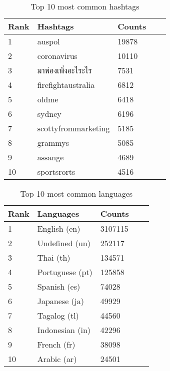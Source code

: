 \documentclass[11pt]{article}
\begin{document}
\begin{table}[h]
 \begin{center}
\begin{tabular}{|l|l|l|l|l|}

      \hline
      Rank &Hashtags & Counts   \\
      \hline\hline
      1 & auspol & 19878 \\
      2 & coronavirus & 10110 \\
      3 & มาพ่องเพิ่งอะไระไร & 7531 \\
      4 & firefightaustralia & 6812 \\
      5 & oldme & 6418 \\
      6 & sydney & 6196 \\
      7 & scottyfrommarketing & 5185\\
      8 & grammys & 5085 \\
      9 & assange & 4689 \\
      10 & sportsrorts & 4516 \\
    
     \hline

\end{tabular}
\caption{Top 10 most common hashtags}\label{table1}
 \end{center}
\end{table}


\begin{table}[h]
 \begin{center}
\begin{tabular}{|l|l|l|l|l|}

      \hline
      Rank &Languages & Counts   \\
      \hline\hline
      1 & English (en) & 3107115 \\
      2 & Undefined (un) & 252117 \\
      3 & Thai (th) & 134571 \\
      4 & Portuguese (pt) & 125858 \\
      5 & Spanish (es) & 74028 \\
      6 & Japanese (ja) & 49929 \\
      7 & Tagalog (tl) & 44560\\
      8 & Indonesian (in) & 42296 \\
      9 & French (fr) & 38098 \\
      10 & Arabic (ar) & 24501 \\
    
     \hline

\end{tabular}
\caption{Top 10 most common languages}\label{table2}
 \end{center}
\end{table}
\end{document}
